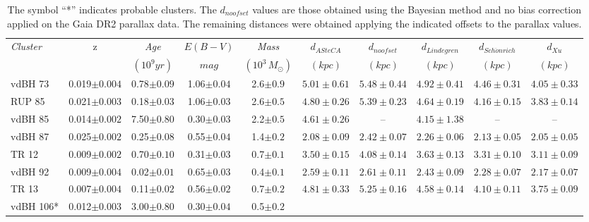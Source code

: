 \documentclass[referee]{aa}
\begin{document}
\begin{table}[ht]
\small
\centering
\caption{The symbol ``*'' indicates probable clusters. The $d_{noofset}$ values
are those obtained using the Bayesian method and no bias correction applied on
the Gaia DR2 parallax data. The remaining distances were obtained applying the
indicated offsets to the parallax values.}
\begin{tabular}{lccccccccc}
\hline \hline 
 \emph{Cluster} & z & \emph{Age} & $E(B-V)$ & \emph{Mass} &
 $d_{ASteCA}$ & $d_{noofset}$ & $d_{Lindegren}$ & $d_{Sch\ddot{o}nrich}$ &
 $d_{Xu}$ \\
& & $(10^9 yr)$ & $mag$ & $(10^3\,M_{\odot})$ & $(kpc)$ & $(kpc)$ & $(kpc)$ &
$(kpc)$ & $(kpc)$\\
 \hline
 vdBH 73 & 0.019$\pm0.004$ & 0.78$\pm0.09$ & 1.06$\pm0.04$ & 2.6$\pm0.9$ &
  $5.01\pm0.61$ & $5.48\pm0.44$ & $4.92\pm0.41$ & $4.46\pm0.31$ & $4.05\pm0.33$\\
 RUP 85 & 0.021$\pm0.003$ & 0.18$\pm0.03$ & 1.06$\pm0.03$ & 2.6$\pm0.5$ &
 $4.80\pm0.26$ & $5.39\pm0.23$ & $4.64\pm0.19$ & $4.16\pm0.15$ & $3.83\pm0.14$\\
 vdBH 85 & 0.014$\pm0.002$ & 7.50$\pm0.80$ & 0.30$\pm0.03$ & 2.2$\pm0.5$ &
  $4.61\pm0.26$ & -- & $4.15\pm1.38$ & -- & --\\
 vdBH 87 & 0.025$\pm0.002$ & 0.25$\pm0.08$ & 0.55$\pm0.04$ & 1.4$\pm0.2$ &
 $2.08\pm0.09$ & $2.42\pm0.07$ & $2.26\pm0.06$ & $2.13\pm0.05$ & $2.05\pm0.05$\\
%
 TR 12 & 0.009$\pm0.002$ & 0.70$\pm0.10$ & 0.31$\pm0.03$ & 0.7$\pm0.1$ &
 $3.50\pm0.15$ & $4.08\pm0.14$ & $3.63\pm0.13$ & $3.31\pm0.10$ & $3.11\pm0.09$\\
 vdBH 92 & 0.009$\pm0.004$ & 0.02$\pm0.01$ & 0.65$\pm0.03$ & 0.4$\pm0.1$ &
 $2.59\pm0.11$ & $2.61\pm0.11$ & $2.43\pm0.09$ & $2.28\pm0.07$ & $2.17\pm0.07$\\
 TR 13 & 0.007$\pm0.004$ & 0.11$\pm0.02$ & 0.56$\pm0.02$ & 0.7$\pm0.2$ &
 $4.81\pm0.33$ & $5.25\pm0.16$ & $4.58\pm0.14$ & $4.10\pm0.11$ & $3.75\pm0.09$\\
 vdBH 106* & 0.012$\pm0.003$ & 3.00$\pm0.80$ & 0.30$\pm0.04$ & 0.5$\pm0.2$ &

\end{tabular}
\end{table}
\end{document}
